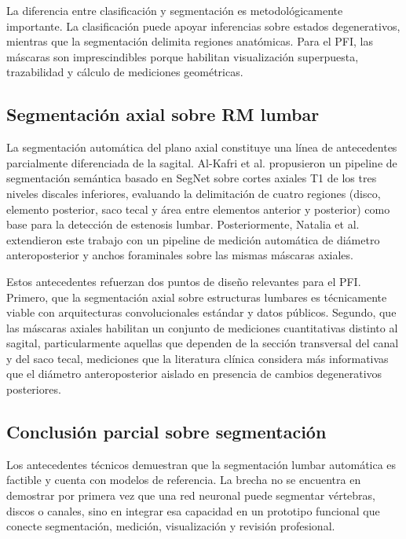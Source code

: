 La diferencia entre clasificación y segmentación es metodológicamente importante. La clasificación puede apoyar inferencias sobre estados degenerativos, mientras que la segmentación delimita regiones anatómicas. Para el PFI, las máscaras son imprescindibles porque habilitan visualización superpuesta, trazabilidad y cálculo de mediciones geométricas.

\subsection{Segmentación axial sobre RM lumbar}

La segmentación automática del plano axial constituye una línea de antecedentes parcialmente diferenciada de la sagital. Al-Kafri et al. \parencite{alkafri_sudirman_boundary_2019} propusieron un pipeline de segmentación semántica basado en SegNet sobre cortes axiales T1 de los tres niveles discales inferiores, evaluando la delimitación de cuatro regiones (disco, elemento posterior, saco tecal y área entre elementos anterior y posterior) como base para la detección de estenosis lumbar. Posteriormente, Natalia et al. \parencite{natalia_measurement_2020} extendieron este trabajo con un pipeline de medición automática de diámetro anteroposterior y anchos foraminales sobre las mismas máscaras axiales.

Estos antecedentes refuerzan dos puntos de diseño relevantes para el PFI. Primero, que la segmentación axial sobre estructuras lumbares es técnicamente viable con arquitecturas convolucionales estándar y datos públicos. Segundo, que las máscaras axiales habilitan un conjunto de mediciones cuantitativas distinto al sagital, particularmente aquellas que dependen de la sección transversal del canal y del saco tecal, mediciones que la literatura clínica considera más informativas que el diámetro anteroposterior aislado en presencia de cambios degenerativos posteriores.

\subsection{Conclusión parcial sobre segmentación}

Los antecedentes técnicos demuestran que la segmentación lumbar automática es factible y cuenta con modelos de referencia. La brecha no se encuentra en demostrar por primera vez que una red neuronal puede segmentar vértebras, discos o canales, sino en integrar esa capacidad en un prototipo funcional que conecte segmentación, medición, visualización y revisión profesional.

